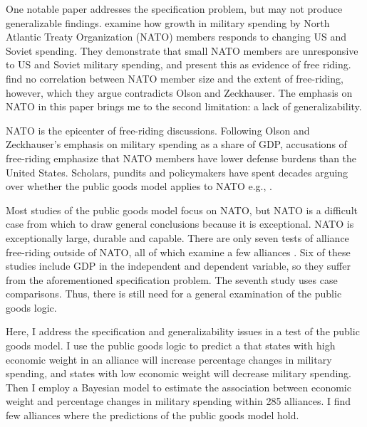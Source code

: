 \documentclass[12pt]{article}
\begin{document}
One notable paper addresses the specification problem, but may not produce generalizable findings. 
\citet{PluemperNeumayer2015} examine how growth in military spending by North Atlantic Treaty Organization (NATO) members responds to changing US and Soviet spending.
They demonstrate that small NATO members are unresponsive to US and Soviet military spending, and present this as evidence of free riding.
\citet{PluemperNeumayer2015} find no correlation between NATO member size and the extent of free-riding, however, which they argue contradicts Olson and Zeckhauser.
The emphasis on NATO in this paper brings me to the second limitation: a lack of generalizability. 


NATO is the epicenter of free-riding discussions. 
Following Olson and Zeckhauser's emphasis on military spending as a share of GDP, accusations of free-riding emphasize that NATO members have lower defense burdens than the United States. 
Scholars, pundits and policymakers have spent decades arguing over whether the public goods model applies to NATO e.g., \citep{SandlerForbes1980, Palmer1990, Boyer1993, GatesTerasawa1992, SandlerHartley2001, Lanoszka2015, PluemperNeumayer2015}.


Most studies of the public goods model focus on NATO, but NATO is a difficult case from which to draw general conclusions because it is exceptional. 
NATO is exceptionally large, durable and capable. 
There are only seven tests of alliance free-riding outside of NATO, all of which examine a few alliances \citep{Russett1970, Starr1974, Reisinger1983, Thies1987, ConybeareSandler1990, OnealWhatley1996, Siroky2012}. 
Six of these studies include GDP in the independent and dependent variable, so they suffer from the aforementioned specification problem.
The seventh study uses case comparisons.
Thus, there is still need for a general examination of the public goods logic. 


Here, I address the specification and generalizability issues in a test of the public goods model.  
I use the public goods logic to predict a that states with high economic weight in an alliance will increase percentage changes in military spending, and states with low economic weight will decrease military spending.
Then I employ a Bayesian model to estimate the association between economic weight and percentage changes in military spending within 285 alliances. 
I find few alliances where the predictions of the public goods model hold. 
\end{document}
